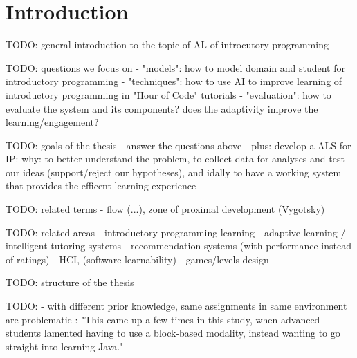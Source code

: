\chapter{Introduction}
\label{chap:introduction}

TODO: general introduction to the topic of AL of introcutory programming

TODO: questions we focus on
- "models": how to model domain and student for introductory programming
- "techniques": how to use AI to improve learning of introductory programming
  in "Hour of Code" tutorials
- "evaluation": how to evaluate the system and its components?
  does the adaptivity improve the learning/engagement?

TODO: goals of the thesis
- answer the questions above
- plus: develop a ALS for IP: why: to better understand the problem,
  to collect data for analyses and test our ideas (support/reject our hypotheses),
  and idally to have a working system that provides the efficent learning experience

TODO: related terms
- flow (...), zone of proximal development (Vygotsky)


TODO: related areas
- introductory programming learning
- adaptive learning / intelligent tutoring systems
- recommendation systems (with performance instead of ratings)
- HCI, (software learnability)
- games/levels design


TODO: structure of the thesis


TODO:
- with different prior knowledge, same assignments in same environment are problematic
\cite{comparing-blocks-text-weintrop2017}:
"This came up a few times in this study, when advanced students lamented
having to use a block-based modality, instead wanting to go straight into learning Java."
